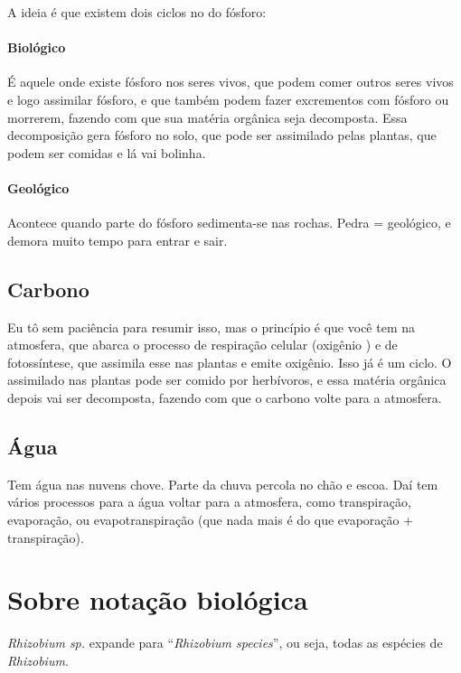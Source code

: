\documentclass{article}
\begin{document}
A ideia é que existem dois ciclos no do fósforo:

\paragraph{Biológico} É aquele onde existe fósforo nos seres vivos, que podem comer outros seres vivos e logo assimilar fósforo, e que também podem fazer excrementos com fósforo ou morrerem, fazendo com que sua matéria orgânica seja decomposta. Essa decomposição gera fósforo no solo, que pode ser assimilado pelas plantas, que podem ser comidas e lá vai bolinha.

\paragraph{Geológico} Acontece quando parte do fósforo sedimenta-se nas rochas. Pedra = geológico, e demora muito tempo para entrar e sair.

\subsection{Carbono}
Eu tô sem paciência para resumir isso, mas o princípio é que você tem  na atmosfera, que abarca o processo de respiração celular (oxigênio \textrightarrow {}) e de fotossíntese, que assimila esse  nas plantas e emite oxigênio. Isso já é um ciclo. O  assimilado nas plantas pode ser comido por herbívoros, e essa matéria orgânica depois vai ser decomposta, fazendo com que o carbono volte para a atmosfera.

\subsection{Água}
Tem água nas nuvens \textrightarrow chove. Parte da chuva percola no chão e escoa. Daí tem vários processos para a água voltar para a atmosfera, como transpiração, evaporação, ou evapotranspiração (que nada mais é do que evaporação + transpiração).
\section{Sobre notação biológica}
\textit{Rhizobium sp.} expande para ``\textit{Rhizobium species}'', ou seja, todas as espécies de \textit{Rhizobium}.
\end{document}
